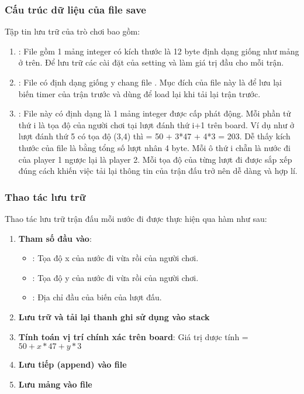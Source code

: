 \subsubsection{Cấu trúc dữ liệu của file save}
Tập tin lưu trữ của trò chơi bao gồm:
\begin{enumerate}
   \item {}: File gồm 1 mảng integer có kích thước là 12 byte định dạng giống như mảng  ở trên. Để lưu trữ các cài đặt của setting và làm giá trị đầu cho  mỗi trận.
   \item {}: File có định dạng giống y chang file . Mục đích của file này là để lưu lại biến timer của trận trước và dùng để load lại  khi tải lại trận trước.
   \item {}: File này có định dạng là 1 mảng integer được cấp phát động. Mỗi phần tử thứ i là tọa độ của người chơi tại lượt đánh thứ i+1 trên board. Ví dụ như ở lượt đánh thứ 5 có tọa độ (3,4) thì  = 50 + 3*47 + 4*3 = 203. Dễ thấy kích thước của file là bằng tổng số lượt nhân 4 byte. Mỗi ô thứ i chẵn là nước đi của player 1 ngược lại là player 2. Mỗi tọa độ của từng lượt đi được sắp xếp đúng cách khiến việc tải lại thông tin của trận đấu trở nên dễ dàng và hợp lí.  
\end{enumerate}

\subsubsection{Thao tác lưu trữ}
Thao tác lưu trữ trận đấu mỗi nước đi được thực hiện qua hàm  như sau:
\begin{enumerate}
   \item \textbf{Tham số đầu vào}: 
   \begin{itemize}
      \item {}: Tọa độ x của nước đi vừa rồi của người chơi.
      \item {}: Tọa độ y của nước đi vừa rồi của người chơi.
      \item {}: Địa chỉ đầu của biến  của lượt đấu.
   \end{itemize}
   \item \textbf{Lưu trữ và tải lại thanh ghi sử dụng vào stack}
   \item \textbf{Tính toán vị trí chính xác trên board}: Giá trị dược tính = \(50 + x*47 + y*3\)
   \item \textbf{Lưu tiếp (append) vào file }
   \item \textbf{Lưu mảng } \textbf{vào file} 
\end{enumerate}

